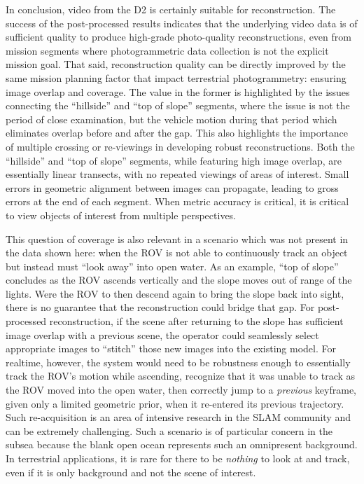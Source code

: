 \documentclass[letterpaper,12pt]{article}
\begin{document}
In conclusion, video from the D2 is certainly suitable for reconstruction.   The success of the post-processed results indicates that the underlying video data is of sufficient quality to produce high-grade photo-quality reconstructions, even from mission segments where photogrammetric data collection is not the explicit mission goal.   That said, reconstruction quality can be directly improved by the same mission planning factor that impact terrestrial photogrammetry:   ensuring image overlap and coverage.   The value in the former is highlighted by the issues connecting the ``hillside'' and ``top of slope'' segments, where the issue is not the period of close examination, but the vehicle motion during that period which eliminates overlap before and after the gap.   This also highlights the importance of multiple crossing or re-viewings in developing robust reconstructions.   Both the ``hillside'' and ``top of slope'' segments, while featuring high image overlap, are essentially linear transects, with no repeated viewings of areas of interest.   Small errors in geometric alignment between images can propagate, leading to gross errors at the end of each segment.   When metric accuracy is critical, it is critical to view objects of interest from multiple perspectives.   

This question of coverage is also relevant in a scenario which was not present in the data shown here: when the ROV is not able to continuously track an object but instead must ``look away'' into open water.  As an example, ``top of slope'' concludes as the ROV ascends vertically and the slope moves out of range of the lights.     Were the ROV to then descend again to bring the slope back into sight, there is no guarantee that the reconstruction could bridge that gap.   For post-processed reconstruction, if the scene after returning to the slope has sufficient image overlap with a previous scene, the operator could seamlessly select appropriate images to ``stitch'' those new images into the existing model.    For realtime, however, the system would need to be robustness enough to essentially track the ROV's motion while ascending, recognize that it was unable to track as the ROV moved into the open water, then correctly jump to a \textit{previous} keyframe, given only a limited geometric prior, when it re-entered its previous trajectory.  Such re-acquisition is an area of intensive research in the SLAM community and can be extremely challenging.    Such a scenario is of particular concern in the subsea because the blank open ocean represents such an omnipresent background.   In terrestrial applications, it is rare for there to be \textit{nothing} to look at and track, even if it is only background and not the scene of interest.
\end{document}
